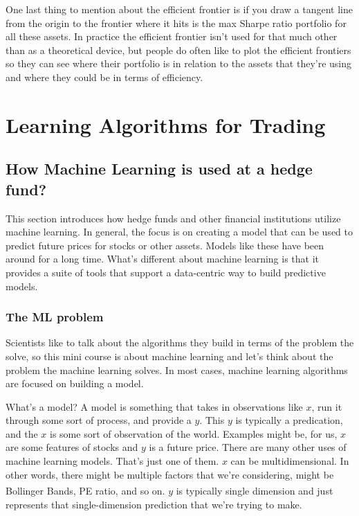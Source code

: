 \documentclass[12pt]{article}
\begin{document}
One last thing to mention about the efficient frontier is if you draw a tangent line from the origin to the frontier where it hits is the max Sharpe ratio portfolio for all these assets. In practice the efficient frontier isn't used for that much other than as a theoretical device, but people do often like to plot the efficient frontiers so they can see where their portfolio is in relation to the assets that they're using and where they could be in terms of efficiency. 


\newpage
\section{Learning Algorithms for Trading}

\subsection{How Machine Learning is used at a hedge fund?}

This section introduces how hedge funds and other financial institutions utilize machine learning. In general, the focus is on creating a model that can be used to predict future prices for stocks or other assets. Models like these have been around for a long time. What's different about machine learning is that it provides a suite of tools that support a data-centric way to build predictive models. 

\subsubsection{The ML problem}

Scientists like to talk about the algorithms they build in terms of the problem the solve, so this mini course is about machine learning and let's think about the problem the machine learning solves. In most cases, machine learning algorithms are focused on building a model. 

What's a model? A model is something that takes in observations like $x$, run it through some sort of process, and provide a $y$. This $y$ is typically a predication, and the $x$ is some sort of observation of the world. Examples might be, for us, $x$ are some features of stocks and $y$ is a future price. There are many other uses of machine learning models. That's just one of them. $x$ can be multidimensional. In other words, there might be multiple factors that we're considering, might be Bollinger Bands\textsuperscript\textregistered, PE ratio, and so on. $y$ is typically single dimension and just represents that single-dimension prediction that we're trying to make. 
\end{document}
